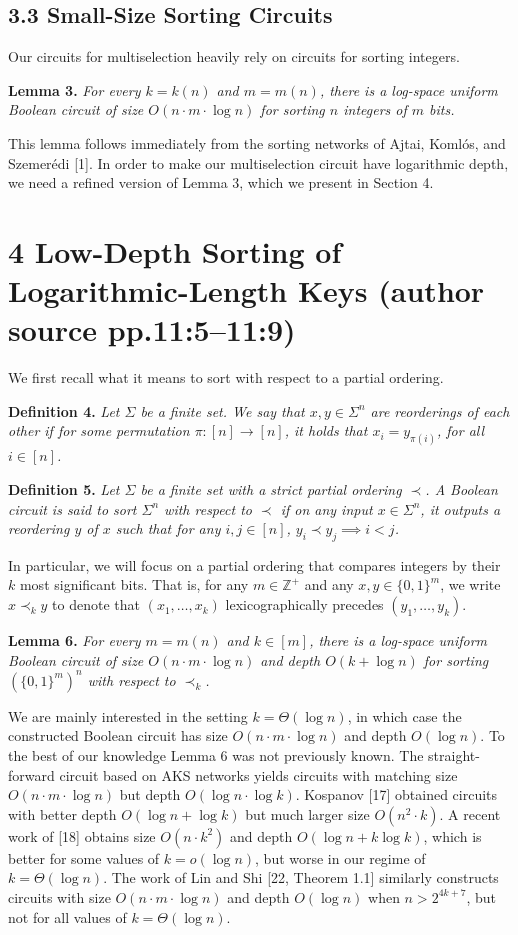 \documentclass[10pt,a4paper]{article}
\newcommand{\bits}{\{0,1\}}
\newcommand{\ZZ}{\mathbb Z}
\newenvironment{originalresult}[1]{\par\medskip\noindent\textbf{#1.}\itshape}{\par\medskip}
\begin{document}
\subsection*{3.3 Small-Size Sorting Circuits}
Our circuits for multiselection heavily rely on circuits for sorting integers.
\begin{originalresult}{Lemma 3}
For every $k=k(n)$ and $m=m(n)$, there is a log-space uniform Boolean circuit of size $O(n\cdot m\cdot\log n)$ for sorting $n$ integers of $m$ bits.
\end{originalresult}
This lemma follows immediately from the sorting networks of Ajtai, Koml\'os, and Szemer\'edi [1]. In order to make our multiselection circuit have logarithmic depth, we need a refined version of Lemma 3, which we present in Section 4.

\section*{4 Low-Depth Sorting of Logarithmic-Length Keys (author source pp.11:5--11:9)}
We first recall what it means to sort with respect to a partial ordering.
\begin{originalresult}{Definition 4}
Let $\Sigma$ be a finite set. We say that $x,y\in\Sigma^n$ are reorderings of each other if for some permutation $\pi:[n]\to[n]$, it holds that $x_i=y_{\pi(i)}$, for all $i\in[n]$.
\end{originalresult}
\begin{originalresult}{Definition 5}
Let $\Sigma$ be a finite set with a strict partial ordering $\prec$. A Boolean circuit is said to sort $\Sigma^n$ with respect to $\prec$ if on any input $x\in\Sigma^n$, it outputs a reordering $y$ of $x$ such that for any $i,j\in[n]$, $y_i\prec y_j\implies i<j$.
\end{originalresult}
In particular, we will focus on a partial ordering that compares integers by their $k$ most significant bits. That is, for any $m\in\ZZ^+$ and any $x,y\in\bits^m$, we write $x\prec_k y$ to denote that $(x_1,\ldots,x_k)$ lexicographically precedes $(y_1,\ldots,y_k)$.
\begin{originalresult}{Lemma 6}
For every $m=m(n)$ and $k\in[m]$, there is a log-space uniform Boolean circuit of size $O(n\cdot m\cdot\log n)$ and depth $O(k+\log n)$ for sorting $(\bits^m)^n$ with respect to $\prec_k$.
\end{originalresult}
We are mainly interested in the setting $k=\Theta(\log n)$, in which case the constructed Boolean circuit has size $O(n\cdot m\cdot\log n)$ and depth $O(\log n)$.
To the best of our knowledge Lemma 6 was not previously known. The straight-forward circuit based on AKS networks yields circuits with matching size $O(n\cdot m\cdot\log n)$ but depth $O(\log n\cdot\log k)$. Kospanov [17] obtained circuits with better depth $O(\log n+\log k)$ but much larger size $O(n^2\cdot k)$. A recent work of [18] obtains size $O(n\cdot k^2)$ and depth $O(\log n+k\log k)$, which is better for some values of $k=o(\log n)$, but worse in our regime of $k=\Theta(\log n)$. The work of Lin and Shi [22, Theorem 1.1] similarly constructs circuits with size $O(n\cdot m\cdot\log n)$ and depth $O(\log n)$ when $n>2^{4k+7}$, but not for all values of $k=\Theta(\log n)$.
\end{document}

